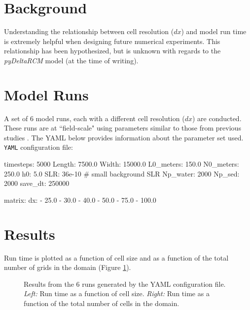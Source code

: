 \section{Background}
Understanding the relationship between cell resolution ($dx$) and model run time is extremely helpful when designing future numerical experiments.
This relationship has been hypothesized, but is unknown with regards to the \textit{pyDeltaRCM} model (at the time of writing). 

\section{Model Runs}
A set of 6 model runs, each with a different cell resolution ($dx$) are conducted.
These runs are at ``field-scale" using parameters similar to those from previous studies \cite{Liang2016, Liang2016a}.
The YAML below provides information about the parameter set used.\\

\noindent \texttt{YAML} configuration file: \vspace{-6pt}
\begin{boxedverbatim}
timesteps: 5000
Length: 7500.0
Width: 15000.0
L0_meters: 150.0
N0_meters: 250.0
h0: 5.0
SLR: 36e-10  # small background SLR
Np_water: 2000
Np_sed: 2000
save_dt: 250000

matrix:
  dx:
    - 25.0
    - 30.0
    - 40.0
    - 50.0
    - 75.0
    - 100.0
\end{boxedverbatim}

\section{Results}
Run time is plotted as a function of cell size and as a function of the total number of grids in the domain (Figure \ref{fig:res_v_runtime}). 

\begin{figure}[!ht]
	\caption{Results from the 6 runs generated by the YAML configuration file. \textit{Left:} Run time as a function of cell size. \textit{Right:} Run time as a function of the total number of cells in the domain.}
	\label{fig:res_v_runtime}
\end{figure}

